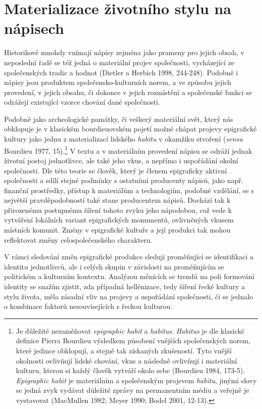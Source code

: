 
\section[materializace-životního-stylu-na-nápisech]{Materializace životního stylu na nápisech}

Historikové mnohdy vnímají nápisy zejména jako prameny pro jejich obsah, v neposlední řadě se též jedná o materiální projev společnosti, vycházející ze společenských tradic a hodnot (Dietler a Herbich 1998, 244-248). Podobně i nápisy jsou produktem společensko-kulturních norem, a ve způsobu jejich provedení, v jejich obsahu, či dokonce v jejich rozmístění a společenské funkci se odrážejí existující vzorce chování dané společnosti.

Podobně jako archeologické památky, či veškerý materiální svět, který nás obklopuje je v klasickém bourdieuovském pojetí možné chápat projevy epigrafické kultury jako jednu z materializací lidského {\em habitu} v okamžiku stvoření ({\em sensu} Bourdieu 1977, 15).\footnote{Je důležité nezaměňovat {\em epigraphic habit} a {\em habitus}. {\em Habitus} je dle klasické definice Pierra Bourdieu výsledkem působení vnějších společenských norem, které jedince obklopují, a stejně tak získaných zkušeností. Tyto vnější okolnosti ovlivňují lidské chování, vkus a následně ovlivňují i materiální kulturu, kterou si každý člověk vytváří okolo sebe (Bourdieu 1984, 173-5). {\em Epigraphic habit} je materiálním a společenským projevem {\em habitu}, jinými slovy se jedná zvyk vydávat důležité zprávy na permanentním médiu a veřejně je vystavovat (MacMullen 1982; Meyer 1990; Bodel 2001, 12-13).} V textu a v materiálním provedení nápisu se odráží jednak životní postoj jednotlivce, ale také jeho vkus, a nepřímo i uspořádání okolní společnosti. Dle této teorie se člověk, který je členem epigraficky aktivní společnosti a sdílí stejné podmínky s ostatními producenty nápisů, jako např. finanční prostředky, přístup k materiálům a technologiím, podobné vzdělání, se s největší pravděpodobností také stane producentem nápisů. Dochází tak k přirozenému postupnému šíření tohoto zvyku jeho nápodobou, což vede k vytváření lokálních variant epigrafických monumentů, ovlivněných vkusem místních komunit. Změny v epigrafické kultuře a její produkci tak mohou reflektovat změny celospolečenského charakteru.

V rámci sledování změn epigrafické produkce sleduji proměňující se identifikaci a identitu jednotlivců, ale i celých skupin v závislosti na proměňujícím se politickém a kulturním kontextu. Analýzou měnících se trendů na poli formování identity se snažím zjistit, zda případná hellénizace, tedy šíření řecké kultury a stylu života, měla zásadní vliv na projevy a uspořádání společnosti, či se jednalo o kombinace faktorů nesouvisejících s řeckou kulturou.

